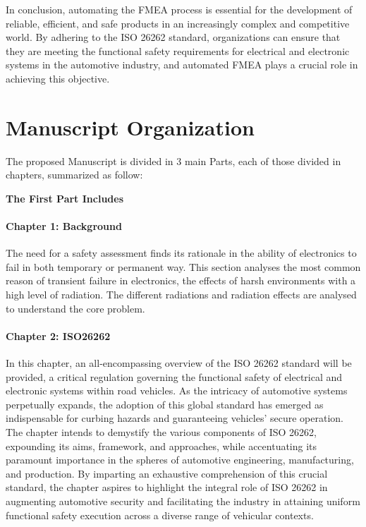\documentclass[./dissertation.tex]{subfiles}
\begin{document}
In conclusion, automating the FMEA process is essential for the development of reliable, efficient, and safe products in an increasingly complex and competitive world. By adhering to the ISO 26262 standard, organizations can ensure that they are meeting the functional safety requirements for electrical and electronic systems in the automotive industry, and automated FMEA plays a crucial role in achieving this objective.


\section{Manuscript Organization}
The proposed Manuscript is divided in 3 main Parts, each of those divided in chapters, summarized as follow:


\noindent\textbf{The First Part Includes}


\paragraph{Chapter 1: Background}
The need for a safety assessment finds its rationale in the ability of electronics to fail in both temporary or permanent way. This section analyses the most common reason of transient failure in electronics, the effects of harsh environments with a high level of radiation. The different radiations and radiation effects are analysed to understand the core problem.
\paragraph{Chapter 2: ISO26262}
In this chapter, an all-encompassing overview of the ISO 26262 standard will be provided, a critical regulation governing the functional safety of electrical and electronic systems within road vehicles. As the intricacy of automotive systems perpetually expands, the adoption of this global standard has emerged as indispensable for curbing hazards and guaranteeing vehicles' secure operation. The chapter intends to demystify the various components of ISO 26262, expounding its aims, framework, and approaches, while accentuating its paramount importance in the spheres of automotive engineering, manufacturing, and production. By imparting an exhaustive comprehension of this crucial standard, the chapter aspires to highlight the integral role of ISO 26262 in augmenting automotive security and facilitating the industry in attaining uniform functional safety execution across a diverse range of vehicular contexts.
\end{document}
